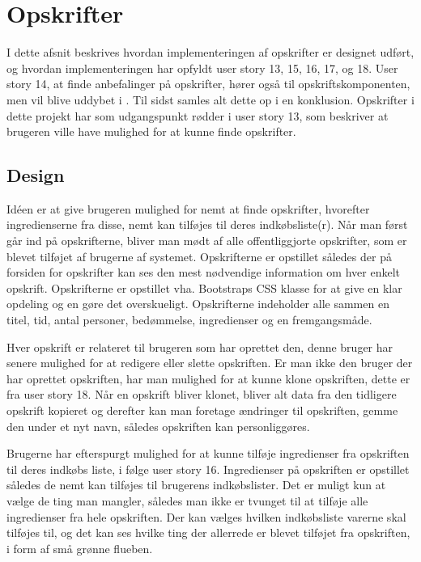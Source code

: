 \section{Opskrifter}
I dette afsnit beskrives hvordan implementeringen af opskrifter er designet udført, og hvordan implementeringen har opfyldt user story 13, 15, 16, 17, og 18. 
User story 14, at finde anbefalinger på opskrifter, hører også til opskriftskomponenten, men vil blive uddybet i . Til sidst samles alt dette op i en konklusion. 
Opskrifter i dette projekt har som udgangspunkt rødder i user story 13, som beskriver at brugeren ville have mulighed for at kunne finde opskrifter.
\subsection{Design}
Idéen er at give brugeren mulighed for nemt at finde opskrifter, hvorefter ingredienserne fra disse, nemt kan tilføjes til deres indkøbsliste(r).
Når man først går ind på opskrifterne, bliver man mødt af alle offentliggjorte opskrifter, som er blevet tilføjet af brugerne af systemet.
Opskrifterne er opstillet således der på forsiden for opskrifter kan ses den mest nødvendige information om hver enkelt opskrift.
Opskrifterne er opstillet vha. Bootstraps CSS klasse  for at give en klar opdeling og en gøre det overskueligt.
Opskrifterne indeholder alle sammen en titel, tid, antal personer, bedømmelse, ingredienser og en fremgangsmåde.

Hver opskrift er relateret til brugeren som har oprettet den, denne bruger har senere mulighed for at redigere eller slette opskriften.
Er man ikke den bruger der har oprettet opskriften, har man mulighed for at kunne klone opskriften, dette er fra user story 18.
Når en opskrift bliver klonet, bliver alt data fra den tidligere opskrift kopieret og derefter kan man foretage ændringer til opskriften, gemme den under et nyt navn, således opskriften kan personliggøres.

Brugerne har efterspurgt mulighed for at kunne tilføje ingredienser fra opskriften til deres indkøbs liste, i følge user story 16.
Ingredienser på opskriften er opstillet således de nemt kan tilføjes til brugerens indkøbslister.
Det er muligt kun at vælge de ting man mangler, således man ikke er tvunget til at tilføje alle ingredienser fra hele opskriften.
Der kan vælges hvilken indkøbsliste varerne skal tilføjes til, og det kan ses hvilke ting der allerrede er blevet tilføjet fra opskriften, i form af små grønne flueben.


